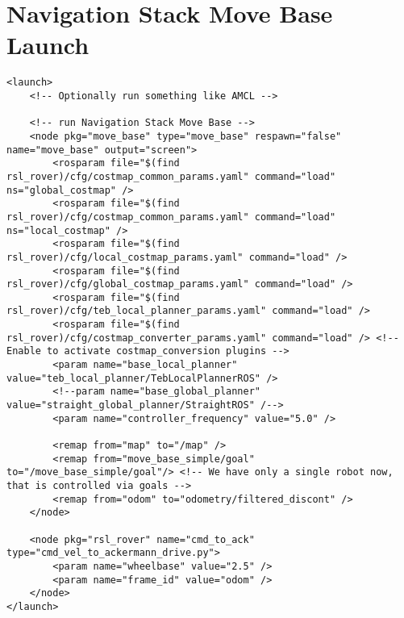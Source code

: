 \section{Navigation Stack Move Base Launch}
\begin{verbatim}
<launch>
	<!-- Optionally run something like AMCL -->

	<!-- run Navigation Stack Move Base -->
  	<node pkg="move_base" type="move_base" respawn="false" name="move_base" output="screen">
	    <rosparam file="$(find rsl_rover)/cfg/costmap_common_params.yaml" command="load" ns="global_costmap" />
	    <rosparam file="$(find rsl_rover)/cfg/costmap_common_params.yaml" command="load" ns="local_costmap" />
	    <rosparam file="$(find rsl_rover)/cfg/local_costmap_params.yaml" command="load" />
	    <rosparam file="$(find rsl_rover)/cfg/global_costmap_params.yaml" command="load" />
	    <rosparam file="$(find rsl_rover)/cfg/teb_local_planner_params.yaml" command="load" />
	    <rosparam file="$(find rsl_rover)/cfg/costmap_converter_params.yaml" command="load" /> <!-- Enable to activate costmap_conversion plugins -->
	    <param name="base_local_planner" value="teb_local_planner/TebLocalPlannerROS" />
	    <!--param name="base_global_planner" value="straight_global_planner/StraightROS" /-->
	    <param name="controller_frequency" value="5.0" />

	    <remap from="map" to="/map" />
	    <remap from="move_base_simple/goal" to="/move_base_simple/goal"/> <!-- We have only a single robot now, that is controlled via goals -->
	    <remap from="odom" to="odometry/filtered_discont" />
 	</node>

	<node pkg="rsl_rover" name="cmd_to_ack" type="cmd_vel_to_ackermann_drive.py">
		<param name="wheelbase" value="2.5" />
		<param name="frame_id" value="odom" />
	</node>
</launch>

\end{verbatim}




